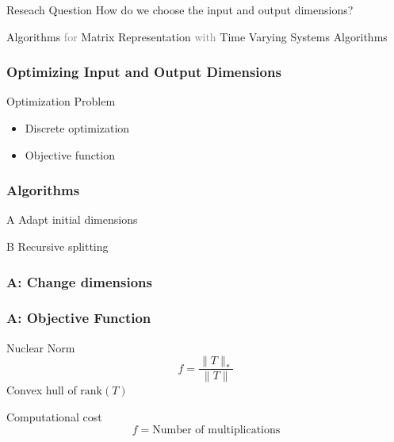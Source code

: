 \documentclass{beamer}
\newcommand{\chapterpage}[1]{
	{\small 
	\textcolor{tumcolor-blue}{Algorithms} 
	\textcolor{gray}{for} 
	\textcolor{tumcolor-blue}{Matrix Representation} 
	\textcolor{gray}{with} 
	\textcolor{tumcolor-blue}{Time Varying Systems}
}
\newline
\phantom{\Huge\emph{} H}
\newline
{\LARGE \textcolor{tumcolor-blue}{#1}}
}
\begin{document}
\begin{frame}
	\begin{exampleblock}{Reseach Question}
		How do we choose the input and output dimensions?
	\end{exampleblock}
\end{frame}

\begin{frame}
	\chapterpage{Algorithms}
\end{frame}

\begin{frame}
\frametitle{Optimizing Input and Output Dimensions}
\begin{block}{Optimization Problem}
	\begin{itemize}
		\item Discrete optimization
		\item Objective function
	\end{itemize}
\end{block}
\end{frame}

\begin{frame}
	\frametitle{Algorithms}
	\begin{exampleblock}{A}
		Adapt initial dimensions
	\end{exampleblock}
	\pause
	\begin{exampleblock}{B}
		Recursive splitting
	\end{exampleblock}
\end{frame}

\begin{frame}
\frametitle{A: Change dimensions}
\scalebox{0.8}{}
\end{frame}

\begin{frame}
	\frametitle{A: Objective Function}
	\begin{block}{Nuclear Norm}
		$$f =  \frac{\|T\|_*}{\|T\|}$$
		Convex hull of $\text{rank}(T)$
	\end{block}
	\begin{block}{Computational cost}
	$$f = \text{Number of multiplications}$$
	\end{block}
\end{frame}
\end{document}
